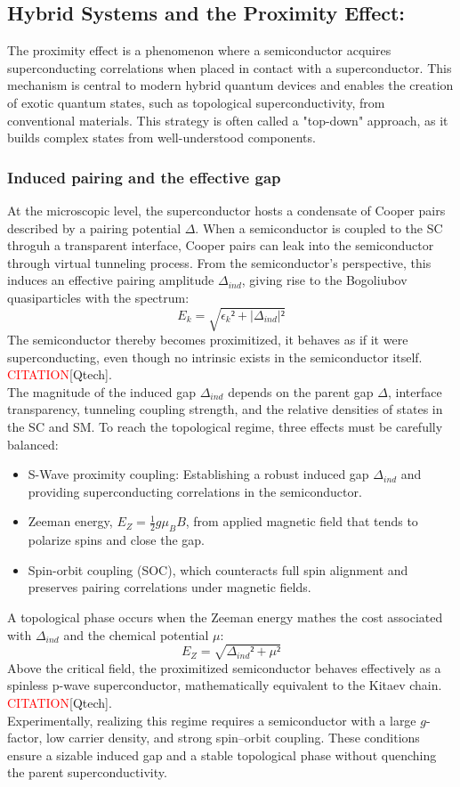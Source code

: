 \documentclass[11pt, letterpaper, titlepage]{article}
\begin{document}
\subsection{Hybrid Systems and the Proximity Effect:} 
The proximity effect is a phenomenon where a semiconductor acquires superconducting correlations when placed in contact with a superconductor. This mechanism is central to modern hybrid quantum devices and enables the creation of exotic quantum states, such as topological superconductivity, from conventional materials. This strategy is often called a "top-down" approach, as it builds complex states from well-understood components.
\subsubsection{Induced pairing and the effective gap}
At the microscopic level, the superconductor hosts a condensate of Cooper pairs described by a pairing potential $Δ$. When a semiconductor is coupled to the SC throguh a transparent interface, Cooper pairs can leak into the semiconductor through virtual tunneling process. From the semiconductor's perspective, this induces an effective pairing amplitude $Δ_{ind}$, giving rise to the Bogoliubov quasiparticles with the spectrum:
$$
E_k = \sqrt{ϵ_k² + |Δ_{ind}|²}
$$
The semiconductor thereby becomes proximitized, it behaves as if it were superconducting, even though no intrinsic exists in the semiconductor itself. \textcolor{red}{CITATION}[Qtech].\\
The magnitude of the induced gap $Δ_{ind}$ depends on 
the parent gap $Δ$, interface transparency, tunneling coupling strength, and the relative densities of states in the SC and SM. To reach the topological regime, three effects must be carefully balanced:
\begin{itemize}
  \item S-Wave proximity coupling: Establishing a robust induced gap $Δ_{ind}$ and providing superconducting correlations in the semiconductor.
  \item Zeeman energy, $E_Z = \frac{1}{2} g μ_B B$, from applied magnetic field that tends to polarize spins and close the gap. 
  \item Spin-orbit coupling (SOC), which counteracts full spin alignment and preserves pairing correlations under magnetic fields.
\end{itemize} 
A topological phase occurs when the Zeeman energy mathes the cost associated with $Δ_{ind}$ and the chemical potential $μ$:
$$
E_Z = \sqrt{Δ_{ind}² + μ²}
$$
Above the critical field, the proximitized semiconductor behaves effectively as a spinless p-wave superconductor,  mathematically equivalent to the Kitaev chain. \textcolor{red}{CITATION}[Qtech].\\
Experimentally, realizing this regime requires a semiconductor with a large $g$-factor, low carrier density, and strong spin–orbit coupling. These conditions ensure a sizable induced gap and a stable topological phase without quenching the parent superconductivity.
\end{document}
